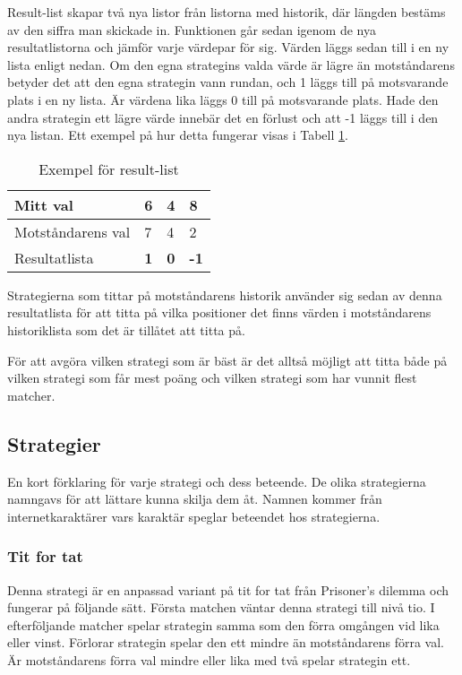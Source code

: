 Result-list skapar två nya listor från listorna med historik, där längden bestäms av den siffra man skickade in. Funktionen går sedan igenom de nya resultatlistorna och jämför varje värdepar för sig. Värden läggs sedan till i en ny lista enligt nedan. Om den egna strategins valda värde är lägre än motståndarens betyder det att den egna strategin vann rundan, och 1 läggs till på motsvarande plats i en ny lista. Är värdena lika läggs 0 till på motsvarande plats. Hade den andra strategin ett lägre värde innebär det en förlust och att -1 läggs till i den nya listan. Ett exempel på hur detta fungerar visas i Tabell \ref{table:result-list}.

\begin{table}[htb]
	\begin{center}
		\begin{tabular}{| l | l | l | l |}
			\hline
			Mitt val & 6 & 4 & 8 \\ \hline
			Motståndarens val & 7 & 4 & 2 \\ \hline
			Resultatlista & \textbf{1} & \textbf{0} & \textbf{-1} \\ \hline
		\end{tabular}
	\end{center}
	\caption{Exempel för result-list}
	\label{table:result-list}
\end{table}

Strategierna som tittar på motståndarens historik använder sig sedan av denna resultatlista för att titta på vilka positioner det finns värden i motståndarens historiklista som det är tillåtet att titta på.

För att avgöra vilken strategi som är bäst är det alltså möjligt att titta både på vilken strategi som får mest poäng och vilken strategi som har vunnit flest matcher.

\subsection{Strategier}
En kort förklaring för varje strategi och dess beteende. De olika strategierna namngavs för att lättare kunna skilja dem åt. Namnen kommer från internetkaraktärer vars karaktär speglar beteendet hos strategierna.

\subsubsection{Tit for tat}
Denna strategi är en anpassad variant på tit for tat från Prisoner’s dilemma och fungerar på följande sätt. Första matchen väntar denna strategi till nivå tio. I efterföljande matcher spelar strategin samma som den förra omgången vid lika eller vinst. Förlorar strategin spelar den ett mindre än motståndarens förra val. Är motståndarens förra val mindre eller lika med två spelar strategin ett.

